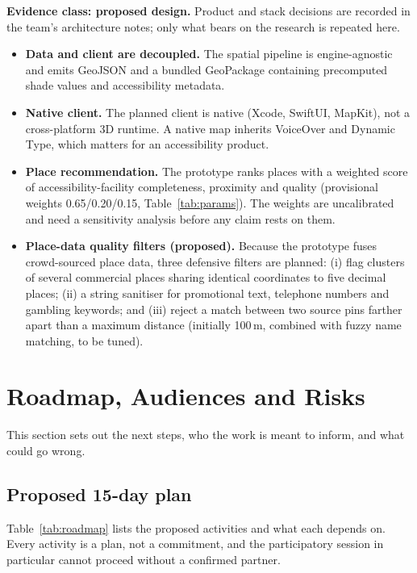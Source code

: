 \documentclass[11pt,a4paper]{article}
\newcommand{\evclass}[2]{\noindent\textcolor{#1}{\small\textbf{Evidence class: #2.}}\enspace}
\begin{document}
\evclass{pijakblue}{proposed design}
Product and stack decisions are recorded in the team's architecture notes; only what bears on the
research is repeated here.

\begin{itemize}
  \item \textbf{Data and client are decoupled.} The spatial pipeline is engine-agnostic and emits
    GeoJSON and a bundled GeoPackage containing precomputed shade values and accessibility metadata.
  \item \textbf{Native client.} The planned client is native (Xcode, SwiftUI, MapKit), not a
    cross-platform 3D runtime. A native map inherits VoiceOver and Dynamic Type, which matters for an
    accessibility product.
  \item \textbf{Place recommendation.} The prototype ranks places with a weighted score of
    accessibility-facility completeness, proximity and quality (provisional weights
    0.65/0.20/0.15, Table~\ref{tab:params}). The weights are uncalibrated and need a sensitivity
    analysis before any claim rests on them.
  \item \textbf{Place-data quality filters (proposed).} Because the prototype fuses crowd-sourced
    place data, three defensive filters are planned: (i) flag clusters of several commercial places
    sharing identical coordinates to five decimal places; (ii) a string sanitiser for promotional
    text, telephone numbers and gambling keywords; and (iii) reject a match between two source pins
    farther apart than a maximum distance (initially 100\,m, combined with fuzzy name matching,
    to be tuned).
\end{itemize}

\section{Roadmap, Audiences and Risks}\label{sec:roadmap}

This section sets out the next steps, who the work is meant to inform, and what could go wrong.

\subsection{Proposed 15-day plan}

Table~\ref{tab:roadmap} lists the proposed activities and what each depends on. Every activity is a plan,
not a commitment, and the participatory session in particular cannot proceed without a confirmed partner.
\end{document}
